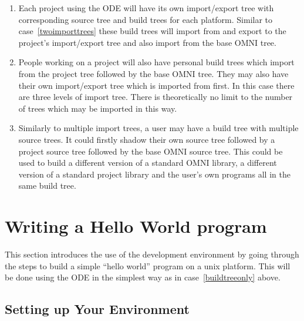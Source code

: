 \documentclass[11pt,twoside,onecolumn]{article}
\begin{document}
\begin{enumerate}
\item Each project using the ODE will have its own import/export tree with
corresponding source tree and build trees for each platform.  Similar to
case~\ref{twoimporttrees} these build trees will import from and export to the
project's import/export tree and also import from the base OMNI tree.

\item People working on a project will also have personal build trees which
import from the project tree followed by the base OMNI tree.  They may also
have their own import/export tree which is imported from first.  In this case
there are three levels of import tree.  There is theoretically no limit to the
number of trees which may be imported in this way.

\item Similarly to multiple import trees, a user may have a build tree with
multiple source trees.  It could firstly shadow their own source tree followed
by a project source tree followed by the base OMNI source tree.  This could be
used to build a different version of a standard OMNI library, a different
version of a standard project library and the user's own programs all in the
same build tree.

\end{enumerate}

\section{Writing a Hello World program}

This section introduces the use of the development environment by going through
the steps to build a simple ``hello world'' program on a unix platform.  This
will be done using the ODE in the simplest way as in case~\ref{buildtreeonly}
above.

\subsection{Setting up Your Environment}
\label{settingenv}

\end{document}
